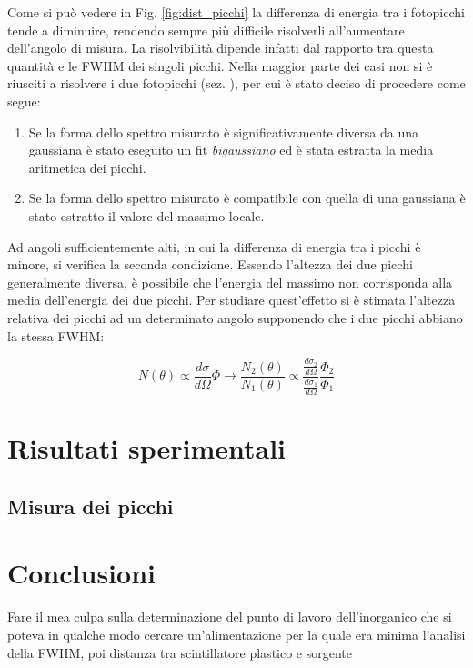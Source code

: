 \documentclass[11pt]{article}
\begin{document}
Come si può vedere in Fig. \ref{fig:dist_picchi} la differenza di energia tra i fotopicchi tende a diminuire, rendendo sempre più difficile risolverli all'aumentare dell'angolo di misura. La risolvibilità dipende infatti dal rapporto tra questa quantità e le FWHM dei singoli picchi. Nella maggior parte dei casi non si è riusciti a risolvere i due fotopicchi (sez. \cite{subsec:picchi}), per cui è stato deciso di procedere come segue:

\begin{enumerate}
\item Se la forma dello spettro misurato è significativamente diversa da una gaussiana è stato eseguito un fit \textit{bigaussiano} ed è stata estratta la media aritmetica dei picchi.
\item Se la forma dello spettro misurato è compatibile con quella di una gaussiana è stato estratto il valore del massimo locale.
\end{enumerate}

Ad angoli sufficientemente alti, in cui la differenza di energia tra i picchi è minore, si verifica la seconda condizione. Essendo l'altezza dei due picchi generalmente diversa, è possibile che l'energia del massimo non corrisponda alla media dell'energia dei due picchi. Per studiare quest'effetto si è stimata l'altezza relativa dei picchi ad un determinato angolo supponendo che i due picchi abbiano la stessa FWHM:

\begin{equation}
N(\theta) \propto \frac{d\sigma}{d\Omega} \Phi \rightarrow \frac{N_2(\theta)}{N_1(\theta)} \propto \frac{\frac{d\sigma_2}{d\Omega}}{\frac{d\sigma_1}{d\Omega}} \frac{\Phi_2}{\Phi_1}
\nonumber
\end{equation}



\section{Risultati sperimentali}
\subsection{Misura dei picchi} \label{subsec:picchi}



\section{Conclusioni}
Fare il mea culpa sulla determinazione del punto di lavoro dell'inorganico che si poteva in qualche modo cercare un'alimentazione per la quale era minima l'analisi della FWHM, poi distanza tra scintillatore plastico e sorgente


\end{document}
